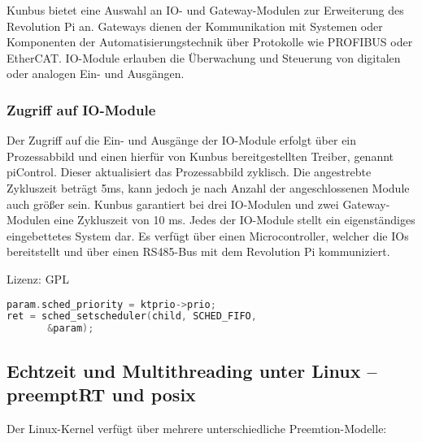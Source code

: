 Kunbus bietet eine Auswahl an IO- und Gateway-Modulen zur Erweiterung des Revolution Pi an.
Gateways dienen der Kommunikation mit Systemen oder Komponenten der Automatisierungstechnik
über Protokolle wie PROFIBUS oder EtherCAT. IO-Module erlauben die Überwachung
und Steuerung von digitalen oder analogen Ein- und Ausgängen.

\subsubsection{Zugriff auf IO-Module%
        \label{sec:2-io}}
Der Zugriff auf die Ein- und Ausgänge der IO-Module erfolgt über ein Prozessabbild
und einen hierfür von Kunbus bereitgestellten Treiber, genannt piControl. Dieser
aktualisiert das Prozessabbild zyklisch. Die angestrebte Zykluszeit beträgt 5ms,
kann jedoch je nach Anzahl der angeschlossenen Module auch größer sein. Kunbus
garantiert bei drei IO-Modulen und zwei Gateway-Modulen eine Zykluszeit von 10 ms.
Jedes der IO-Module stellt ein eigenständiges eingebettetes System dar. Es verfügt
über einen Microcontroller, welcher die IOs bereitstellt und über einen RS485-Bus
mit dem Revolution Pi kommuniziert.

Lizenz: GPL

\begin{lstlisting}[language={c},firstnumber={226},caption={Setzen der Scheduler-Priorität auf SCHED\_FIFO in revpi\_common.c\label{lst:2-sched_priority}}]
param.sched_priority = ktprio->prio;
ret = sched_setscheduler(child, SCHED_FIFO,
       &param);
\end{lstlisting}


\subsection{Echtzeit und Multithreading unter Linux -- preemptRT und posix%
     \label{sec:2-echtzeit}}


 Der Linux-Kernel verfügt über mehrere unterschiedliche Preemtion-Modelle:

